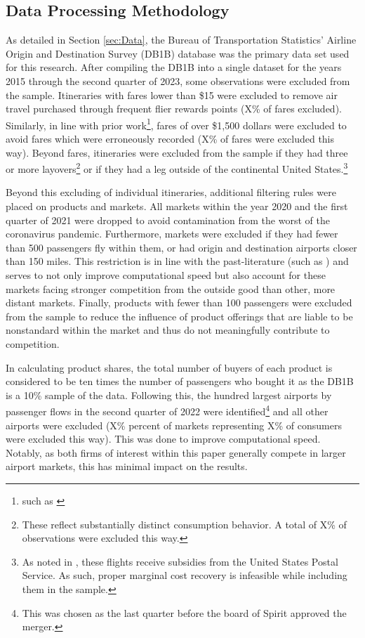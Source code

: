 \documentclass{article}
\begin{document}
\pagebreak 
\begin{appendices}
	
	\section{Data Processing Methodology}
	\label{sec:DataProcessing}
	As detailed in Section \ref{sec:Data},	the Bureau of Transportation Statistics' Airline Origin and Destination Survey (DB1B) database was the primary data set used for this research. After compiling the DB1B into a single dataset for the years 2015 through the second quarter of 2023, some observations were excluded from the sample. Itineraries with fares lower than \$15 were excluded to remove air travel purchased through frequent flier rewards points ({X}\% of fares excluded). Similarly, in line with prior work\footnote{such as \citet{berry_tracing_2010}}, fares of over \$1,500 dollars were excluded to avoid fares which were erroneously recorded (X\% of fares were excluded this way). Beyond fares, itineraries were excluded from the sample if they had three or more layovers\footnote{These reflect substantially distinct consumption behavior. A total of X\% of observations were excluded this way.} or if they had a leg outside of the continental United States.\footnote{As noted in \citet{ciliberto_market_2021}, these flights receive subsidies from the United States Postal Service. As such, proper marginal cost recovery is infeasible while including them in the sample.} 
	
	Beyond this excluding of individual itineraries, additional filtering rules were placed on products and markets. All markets within the year 2020 and the first quarter of 2021 were dropped to avoid contamination from the worst of the coronavirus pandemic. Furthermore, markets were excluded if they had fewer than 500 passengers fly within them, or had origin and destination airports closer than 150 miles. This restriction is in line with the past-literature (such as \citet{ciliberto_does_2014}) and serves to not only improve computational speed but also account for these markets facing stronger competition from the outside good than other, more distant markets. Finally, products with fewer than 100 passengers were excluded from the sample to reduce the influence of product offerings that are liable to be nonstandard within the market and thus do not meaningfully contribute to competition. 
    	
	In calculating product shares, the total number of buyers of each product is considered to be ten times the number of passengers who bought it as the DB1B is a 10\% sample of the data. Following this, the hundred largest airports by passenger flows in the second quarter of 2022 were identified\footnote{This was chosen as the last quarter before the board of Spirit approved the merger.} and all other airports were excluded (X\% percent of markets representing X\% of consumers were excluded this way). This was done to improve computational speed. Notably, as both firms of interest within this paper generally compete in larger airport markets, this has minimal impact on the results.  
	

\end{appendices}
\end{document}
